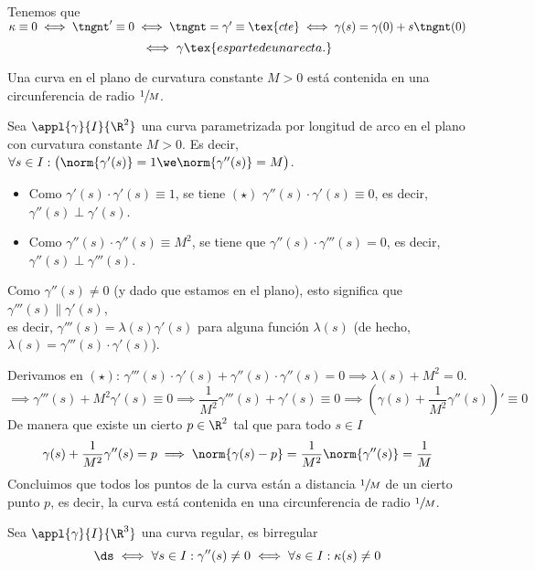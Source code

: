 \begin{ejem}
	\mbox{ } \\
	Tenemos que $\kappa \equiv 0 \iff \tngnt' \equiv 0 \iff \tngnt = \gamma' \equiv \tex{cte} \iff \gamma(s) = \gamma(0) + s\tngnt(0)$ \[\iff \gamma \tex{ es parte de una recta.}\]
\end{ejem}

\begin{prop}
	Una curva en el plano de curvatura constante $M > 0$ está contenida en una circunferencia de radio $\sfrac{1}{M}$.
	\begin{dem}
		Sea $\appl{\gamma}{I}{\R^2}$ una curva parametrizada por longitud de arco en el plano con curvatura constante $M > 0$. Es decir, $\forall s \in I : \big(\norm{\gamma'(s)}=1 \we \norm{\gamma''(s)}=M\big)$.
		\begin{itemize}
			\item Como $\gamma'(s) \cdot \gamma'(s) \equiv 1$, se tiene $(\star)$ $\gamma''(s) \cdot \gamma'(s) \equiv 0$, es decir, $\gamma''(s) \perp \gamma'(s)$.
			\item Como $\gamma''(s) \cdot \gamma''(s) \equiv M^2$, se tiene que $\gamma''(s) \cdot \gamma'''(s) = 0$, es decir, $\gamma''(s) \perp \gamma'''(s)$.
		\end{itemize}
		Como $\gamma''(s) \neq 0$ (y dado que estamos en el plano), esto significa que $\gamma'''(s) \parallel \gamma'(s)$, \\
		es decir, $\gamma'''(s) = \lambda(s) \gamma'(s)$ para alguna función $\lambda(s)$ (de hecho, $\lambda(s) = \gamma'''(s) \cdot \gamma'(s)$).

		Derivamos en $(\star)$: $\gamma'''(s)\cdot \gamma'(s) + \gamma''(s)\cdot \gamma''(s) = 0 \implies \lambda(s) + M^2 = 0$.
		\[\implies \gamma'''(s) + M^2\gamma'(s)\equiv 0 \implies \frac{1}{M^2}\gamma'''(s) + \gamma'(s)\equiv 0 \implies \left(\gamma(s) + \frac{1}{M^2}\gamma''(s)\right)'\equiv 0\]
		De manera que existe un cierto $p\in \R^2$ tal que para todo $s\in I$
		\[\gamma(s) + \frac{1}{M^2}\gamma''(s) = p \implies \norm{\gamma(s) - p} = \frac{1}{M^2} \norm{\gamma''(s)} = \frac{1}{M}\]
		Concluimos que todos los puntos de la curva están a distancia $\sfrac{1}{M}$ de un cierto punto $p$, es decir, la curva está contenida en una circunferencia de radio $\sfrac{1}{M}$.
	\end{dem}
\end{prop}

\begin{defn}
	Sea $\appl{\gamma}{I}{\R^3}$ una curva regular, es birregular \[\ds\iff \forall s \in I : \gamma''(s) \ne 0 \iff\forall s \in I : \kappa(s)\ne 0\]
\end{defn}

